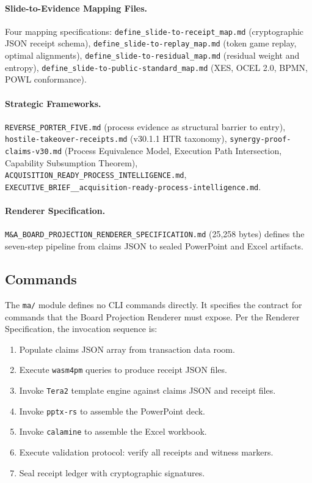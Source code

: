 \paragraph{Slide-to-Evidence Mapping Files.}
Four mapping specifications:
\texttt{define\_slide-to-receipt\_map.md} (cryptographic JSON receipt schema),
\texttt{define\_slide-to-replay\_map.md} (token game replay, optimal alignments),
\texttt{define\_slide-to-residual\_map.md} (residual weight and entropy),
\texttt{define\_slide-to-public-standard\_map.md} (XES, OCEL 2.0, BPMN, POWL conformance).

\paragraph{Strategic Frameworks.}
\texttt{REVERSE\_PORTER\_FIVE.md} (process evidence as structural barrier to entry),
\texttt{hostile-takeover-receipts.md} (v30.1.1 HTR taxonomy),
\texttt{synergy-proof-claims-v30.md} (Process Equivalence Model, Execution Path Intersection,
Capability Subsumption Theorem),
\texttt{ACQUISITION\_READY\_PROCESS\_INTELLIGENCE.md},
\texttt{EXECUTIVE\_BRIEF\_\_acquisition-ready-process-intelligence.md}.

\paragraph{Renderer Specification.}
\texttt{M\&A\_BOARD\_PROJECTION\_RENDERER\_SPECIFICATION.md} (25,258 bytes) defines the
seven-step pipeline from claims JSON to sealed PowerPoint and Excel artifacts.

\subsection{Commands}
\label{sec:ma-impl-commands}

The \texttt{ma/} module defines no CLI commands directly. It specifies the contract for
commands that the Board Projection Renderer must expose. Per the Renderer Specification, the
invocation sequence is:

\begin{enumerate}
  \item Populate claims JSON array from transaction data room.
  \item Execute \texttt{wasm4pm} queries to produce receipt JSON files.
  \item Invoke \texttt{Tera2} template engine against claims JSON and receipt files.
  \item Invoke \texttt{pptx-rs} to assemble the PowerPoint deck.
  \item Invoke \texttt{calamine} to assemble the Excel workbook.
  \item Execute validation protocol: verify all receipts and witness markers.
  \item Seal receipt ledger with cryptographic signatures.
\end{enumerate}

